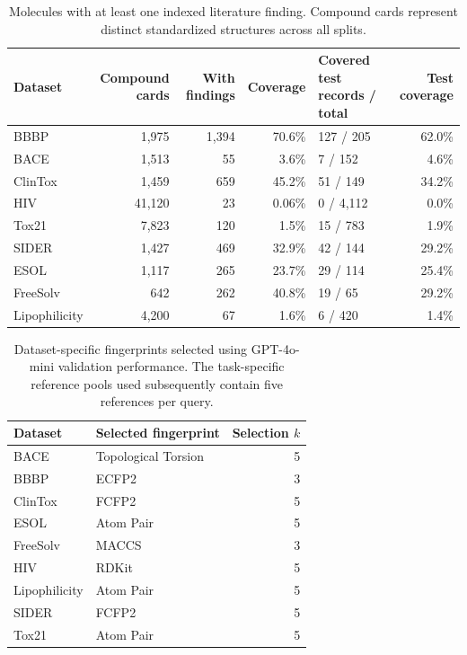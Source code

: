 \begin{table}[t]
\centering
\small
\begin{tabular}{lrrrlr}
\toprule
\textbf{Dataset} & \textbf{Compound cards} & \textbf{With findings} & \textbf{Coverage} & \textbf{Covered test records / total} & \textbf{Test coverage} \\
\midrule
BBBP          & 1,975 & 1,394 & 70.6\% & 127 / 205 & 62.0\% \\
BACE          & 1,513 & 55 & 3.6\% & 7 / 152 & 4.6\% \\
ClinTox       & 1,459 & 659 & 45.2\% & 51 / 149 & 34.2\% \\
HIV           & 41,120 & 23 & 0.06\% & 0 / 4,112 & 0.0\% \\
Tox21         & 7,823 & 120 & 1.5\% & 15 / 783 & 1.9\% \\
SIDER         & 1,427 & 469 & 32.9\% & 42 / 144 & 29.2\% \\
ESOL          & 1,117 & 265 & 23.7\% & 29 / 114 & 25.4\% \\
FreeSolv      & 642 & 262 & 40.8\% & 19 / 65 & 29.2\% \\
Lipophilicity & 4,200 & 67 & 1.6\% & 6 / 420 & 1.4\% \\
\bottomrule
\end{tabular}
\caption{Molecules with at least one indexed literature finding. Compound cards represent distinct standardized structures across all splits.}
\label{tab:compound-evidence-coverage}
\end{table}

\begin{table}[t]
\centering
\small
\begin{tabular}{llr}
\toprule
\textbf{Dataset} & \textbf{Selected fingerprint} & \textbf{Selection $k$} \\
\midrule
BACE          & Topological Torsion  & 5 \\
BBBP          & ECFP2                & 3 \\
ClinTox       & FCFP2                & 5 \\
ESOL          & Atom Pair            & 5 \\
FreeSolv      & MACCS                & 3 \\
HIV           & RDKit                & 5 \\
Lipophilicity & Atom Pair            & 5 \\
SIDER         & FCFP2                & 5 \\
Tox21         & Atom Pair            & 5 \\
\bottomrule
\end{tabular}
\caption{Dataset-specific fingerprints selected using GPT-4o-mini validation performance. The task-specific reference pools used subsequently contain five references per query.}
\label{tab:best_fingerprints}
\end{table}

